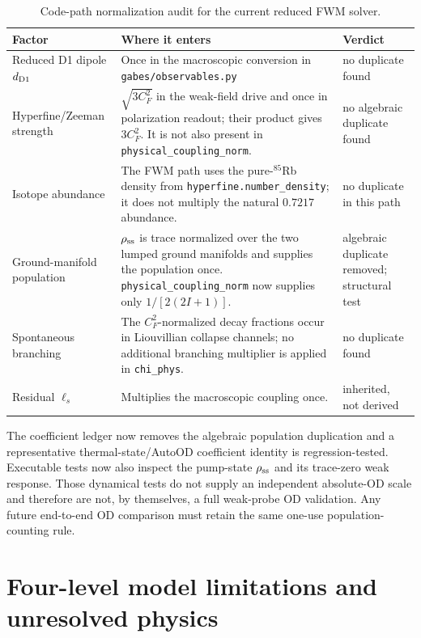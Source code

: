 \documentclass[11pt,a4paper]{article}
\begin{document}
\begin{table}[ht]
\centering
\caption{Code-path normalization audit for the current reduced FWM solver.}
\label{tab:normalization-audit}
\small
\begin{tabularx}{\textwidth}{L{3.2cm}Y L{2.5cm}}
\toprule
Factor & Where it enters & Verdict\\
\midrule
Reduced D1 dipole $d_{\rm D1}$ &
Once in the macroscopic conversion in
\texttt{gabes/observables.py} & no duplicate found\\
Hyperfine/Zeeman strength &
$\sqrt{3C_F^2}$ in the weak-field drive and once in polarization readout;
their product gives $3C_F^2$. It is not also present in
\texttt{physical\_coupling\_norm}. & no algebraic duplicate found\\
Isotope abundance &
The FWM path uses the pure-$^{85}$Rb density from
\texttt{hyperfine.number\_density}; it does not multiply the natural
$0.7217$ abundance. & no duplicate in this path\\
Ground-manifold population &
$\rho_{\rm ss}$ is trace normalized over the two lumped ground manifolds and
supplies the population once. \texttt{physical\_coupling\_norm} now supplies
only $1/[2(2I+1)]$. & algebraic duplicate removed; structural test\\
Spontaneous branching &
The $C_F^2$-normalized decay fractions occur in Liouvillian collapse
channels; no additional branching multiplier is applied in
\texttt{chi\_phys}. & no duplicate found\\
Residual $\ell_s$ &
Multiplies the macroscopic coupling once. & inherited, not derived\\
\bottomrule
\end{tabularx}
\end{table}

The coefficient ledger now removes the algebraic population duplication and a
representative thermal-state/AutoOD coefficient identity is regression-tested.
Executable tests now also inspect the pump-state $\rho_{\rm ss}$ and its
trace-zero weak response. Those dynamical tests do not supply an independent
absolute-OD scale and therefore are not, by themselves, a full weak-probe OD
validation. Any future end-to-end OD comparison must retain the same one-use
population-counting rule.

\section{Four-level model limitations and unresolved physics}
\label{app:limitations}
\end{document}
